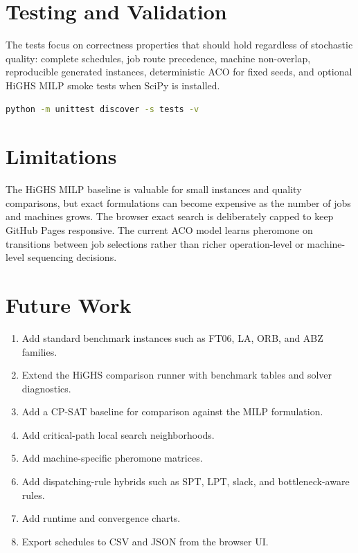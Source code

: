 \documentclass[11pt]{article}
\begin{document}
\section{Testing and Validation}
The tests focus on correctness properties that should hold regardless of stochastic quality: complete schedules, job route precedence, machine non-overlap, reproducible generated instances, deterministic ACO for fixed seeds, and optional HiGHS MILP smoke tests when SciPy is installed.
\begin{lstlisting}[language=bash]
python -m unittest discover -s tests -v
\end{lstlisting}
\section{Limitations}
The HiGHS MILP baseline is valuable for small instances and quality comparisons, but exact formulations can become expensive as the number of jobs and machines grows. The browser exact search is deliberately capped to keep GitHub Pages responsive. The current ACO model learns pheromone on transitions between job selections rather than richer operation-level or machine-level sequencing decisions.
\section{Future Work}
\begin{enumerate}[leftmargin=0.25in]
\item Add standard benchmark instances such as FT06, LA, ORB, and ABZ families.
\item Extend the HiGHS comparison runner with benchmark tables and solver diagnostics.
\item Add a CP-SAT baseline for comparison against the MILP formulation.
\item Add critical-path local search neighborhoods.
\item Add machine-specific pheromone matrices.
\item Add dispatching-rule hybrids such as SPT, LPT, slack, and bottleneck-aware rules.
\item Add runtime and convergence charts.
\item Export schedules to CSV and JSON from the browser UI.
\end{enumerate}
\end{document}
